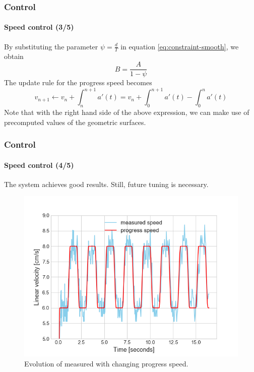 \documentclass[10pt]{beamer}
\begin{document}

\begin{frame}
\frametitle{Control}
\framesubtitle{Speed control (3/5)}
By substituting the parameter $\psi = \frac{d}{T}$ in equation \ref{eq:constraint-smooth}, we obtain
$$
\boxed{B = \frac{A}{1-\psi}} 
$$
The update rule for the progress speed becomes
$$
v_{n+1} \leftarrow v_n + \int_{n}^{n+1}a'(t) = v_n + \int_{0}^{n+1}a'(t) - \int_{0}^{n}a'(t)
$$
Note that with the right hand side of the above expression, we can make use of precomputed values of the geometric surfaces.
\end{frame}


\begin{frame}
\frametitle{Control}
\framesubtitle{Speed control (4/5)}
The system achieves good results. Still, future tuning is necessary.
\begin{figure}[hbtp]
\centering
\label{fig:all-cycles}
\includegraphics[scale=0.45]{figures/pid_speed_normal.png}
\caption{Evolution of measured with changing progress speed.}
\end{figure}
\end{frame}

\end{document}
